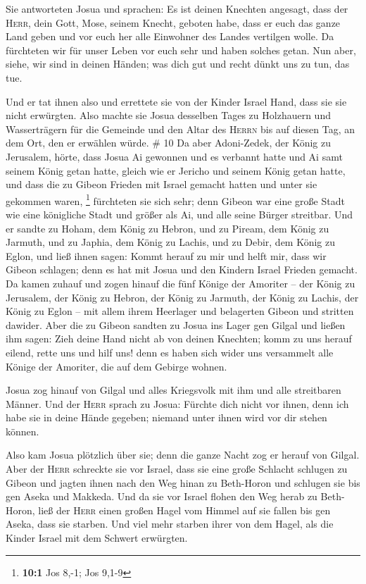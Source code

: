  Sie antworteten Josua und sprachen: Es ist deinen
Knechten angesagt, dass der \textsc{Herr}, dein Gott, Mose, seinem
Knecht, geboten habe, dass er euch das ganze Land geben und vor euch her
alle Einwohner des Landes vertilgen wolle. Da fürchteten wir für unser
Leben vor euch sehr und haben solches getan.  Nun aber,
siehe, wir sind in deinen Händen; was dich gut und recht dünkt uns zu
tun, das tue.

 Und er tat ihnen also und errettete sie von der Kinder
Israel Hand, dass sie sie nicht erwürgten.  Also machte
sie Josua desselben Tages zu Holzhauern und Wasserträgern für die
Gemeinde und den Altar des \textsc{Herrn} bis auf diesen Tag, an dem
Ort, den er erwählen würde. \# 10  Da aber Adoni-Zedek,
der König zu Jerusalem, hörte, dass Josua Ai gewonnen und es verbannt
hatte und Ai samt seinem König getan hatte, gleich wie er Jericho und
seinem König getan hatte, und dass die zu Gibeon Frieden mit Israel
gemacht hatten und unter sie gekommen waren, \footnote{\textbf{10:1} Jos
  8,-1; Jos 9,1-9}  fürchteten sie sich sehr; denn Gibeon
war eine große Stadt wie eine königliche Stadt und größer als Ai, und
alle seine Bürger streitbar.  Und er sandte zu Hoham, dem
König zu Hebron, und zu Piream, dem König zu Jarmuth, und zu Japhia, dem
König zu Lachis, und zu Debir, dem König zu Eglon, und ließ ihnen sagen:
 Kommt herauf zu mir und helft mir, dass wir Gibeon
schlagen; denn es hat mit Josua und den Kindern Israel Frieden gemacht.
 Da kamen zuhauf und zogen hinauf die fünf Könige der
Amoriter -- der König zu Jerusalem, der König zu Hebron, der König zu
Jarmuth, der König zu Lachis, der König zu Eglon -- mit allem ihrem
Heerlager und belagerten Gibeon und stritten dawider. 
Aber die zu Gibeon sandten zu Josua ins Lager gen Gilgal und ließen ihm
sagen: Zieh deine Hand nicht ab von deinen Knechten; komm zu uns herauf
eilend, rette uns und hilf uns! denn es haben sich wider uns versammelt
alle Könige der Amoriter, die auf dem Gebirge wohnen.

 Josua zog hinauf von Gilgal und alles Kriegsvolk mit ihm
und alle streitbaren Männer.  Und der \textsc{Herr} sprach
zu Josua: Fürchte dich nicht vor ihnen, denn ich habe sie in deine Hände
gegeben; niemand unter ihnen wird vor dir stehen können.

 Also kam Josua plötzlich über sie; denn die ganze Nacht
zog er herauf von Gilgal.  Aber der \textsc{Herr}
schreckte sie vor Israel, dass sie eine große Schlacht schlugen zu
Gibeon und jagten ihnen nach den Weg hinan zu Beth-Horon und schlugen
sie bis gen Aseka und Makkeda.  Und da sie vor Israel
flohen den Weg herab zu Beth-Horon, ließ der \textsc{Herr} einen großen
Hagel vom Himmel auf sie fallen bis gen Aseka, dass sie starben. Und
viel mehr starben ihrer von dem Hagel, als die Kinder Israel mit dem
Schwert erwürgten.

